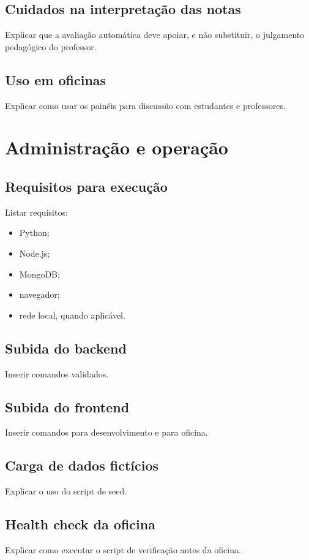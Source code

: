 \documentclass[12pt,a4paper]{article}
\begin{document}
\subsection{Cuidados na interpretação das notas}
Explicar que a avaliação automática deve apoiar, e não substituir, o julgamento pedagógico do professor.

\subsection{Uso em oficinas}
Explicar como usar os painéis para discussão com estudantes e professores.

\section{Administração e operação}

\subsection{Requisitos para execução}
Listar requisitos:
\begin{itemize}
    \item Python;
    \item Node.js;
    \item MongoDB;
    \item navegador;
    \item rede local, quando aplicável.
\end{itemize}

\subsection{Subida do backend}
Inserir comandos validados.

\subsection{Subida do frontend}
Inserir comandos para desenvolvimento e para oficina.

\subsection{Carga de dados fictícios}
Explicar o uso do script de seed.

\subsection{Health check da oficina}
Explicar como executar o script de verificação antes da oficina.
\end{document}
